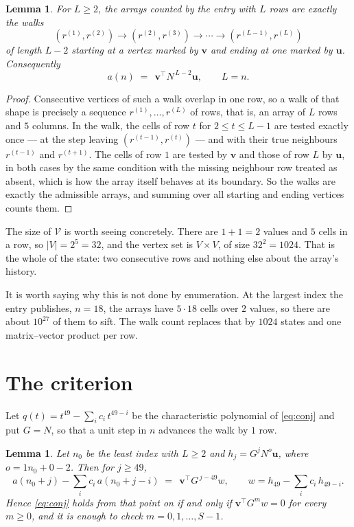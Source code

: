 \documentclass[11pt,a4paper]{article}
\theoremstyle{plain}
\newtheorem{lemma}[theorem]{Lemma}
\theoremstyle{definition}
\begin{document}
\begin{lemma}\label{lem:walk}
For $L\ge2$, the arrays counted by the entry with $L$ rows are exactly the walks
\[
(r^{(1)},r^{(2)})\to(r^{(2)},r^{(3)})\to\cdots\to(r^{(L-1)},r^{(L)})
\]
of length $L-2$ starting at a vertex marked by $\mathbf{v}$ and ending at one marked by
$\mathbf{u}$. Consequently
\[
a(n)\;=\;\,\mathbf{v}^{\!\top}N^{\,L-2}\mathbf{u},\qquad L=n .
\]
\end{lemma}

\begin{proof}
Consecutive vertices of such a walk overlap in one row, so a walk of that shape is
precisely a sequence $r^{(1)},\dots,r^{(L)}$ of rows, that is, an array of $L$ rows
and $5$ columns. In the walk, the cells of row $t$ for $2\le t\le L-1$ are tested
exactly once --- at the step leaving $(r^{(t-1)},r^{(t)})$ --- and with their true
neighbours $r^{(t-1)}$ and $r^{(t+1)}$. The cells of row $1$ are tested by
$\mathbf{v}$ and those of row $L$ by $\mathbf{u}$, in both cases by the same condition
with the missing neighbour row treated as absent, which is how the array itself behaves at
its boundary. So the walks are exactly the admissible arrays, and summing over all starting
and ending vertices counts them.
\end{proof}


The size of $\mathcal V$ is worth seeing concretely. There are $1+1=2$ values
and $5$ cells in a row, so $|V|=2^{5}=32$, and the vertex set is
$V\times V$, of size $32^2=1024$. That is the whole of the state: two consecutive
rows and nothing else about the array's history.

It is worth saying why this is not done by enumeration. At the largest index the entry
publishes, $n=18$, the arrays have $5\cdot18$ cells over
$2$ values, so there are about $10^{27}$ of them to sift. The
walk count replaces that by $1024$ states and one matrix--vector product per row.
\section{The criterion}

Let $q(t)=t^{49}-\sum_i c_i\,t^{49-i}$ be the characteristic polynomial of
\eqref{eq:conj} and put $G=N$, so that a unit step in $n$ advances the walk by
$1$ row.

\begin{lemma}\label{lem:crit}
Let $n_0$ be the least index with $L\ge2$ and $h_j=G^{j}N^{o}\mathbf{u}$, where
$o=1n_0+0-2$. Then for $j\ge49$,
\[
a(n_0+j)-\sum_i c_i\,a(n_0+j-i)\;=\;\,\mathbf{v}^{\!\top}G^{\,j-49}w,
\qquad w=h_{49}-\sum_i c_i\,h_{49-i} .
\]
Hence \eqref{eq:conj} holds from that point on if and only if
$\mathbf{v}^{\!\top}G^{m}w=0$ for every $m\ge0$, and it is enough to check
$m=0,1,\dots,S-1$.
\end{lemma}
\end{document}
